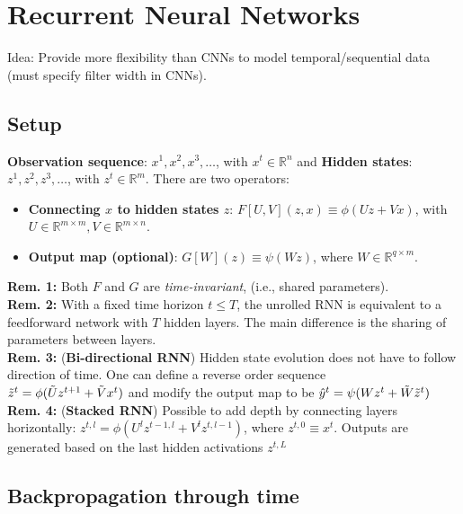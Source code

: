 \section{Recurrent Neural Networks}
Idea: Provide more flexibility than CNNs to model temporal/sequential data (must specify filter width in CNNs).

\subsection{Setup}
\textbf{Observation sequence}: $x^1,x^2,x^3,\dots$, with $x^t \in \mathbb{R}^n$ and \textbf{Hidden states}: $z^1,z^2,z^3,\dots$, with $z^t \in \mathbb{R}^m$. There are two operators:
\begin{itemize}
    \item \textbf{Connecting $x$ to hidden states $z$}: $F[U,V](z,x) \equiv \phi(Uz + Vx)$, with $U \in \mathbb{R}^{m\times m}, V \in \mathbb{R}^{m\times n}$.
    \item \textbf{Output map (optional)}: $G[W](z) \equiv \psi(Wz)$, where $W \in \mathbb{R}^{q\times m}$.
\end{itemize}

\textbf{Rem. 1:} Both $F$ and $G$ are \emph{time-invariant}, (i.e., shared parameters). \\
\textbf{Rem. 2:} With a fixed time horizon $t \leq T$, the unrolled RNN is equivalent to a feedforward network with $T$ hidden layers. The main difference is the sharing of parameters between layers. \\
\textbf{Rem. 3:} (\textbf{Bi-directional RNN}) Hidden state evolution does not have to follow direction of time. One can define a reverse order sequence \\ 
$\Tilde{z}^t = \phi(\Tilde{U}z^{t+1} + \Tilde{V}x^t)$ and modify the output map to be $\hat{y}^t = \psi(Wz^t + \Tilde{W}\Tilde{z}^t)$\\
\textbf{Rem. 4:} (\textbf{Stacked RNN}) Possible to add depth by connecting layers horizontally: $z^{t,l} = \phi(U^l z^{t-1,l} + V^l z^{t, l-1})$, where $z^{t,0} \equiv x^t$. Outputs are generated based on the last hidden activations $z^{t,L}$

\subsection{Backpropagation through time}

